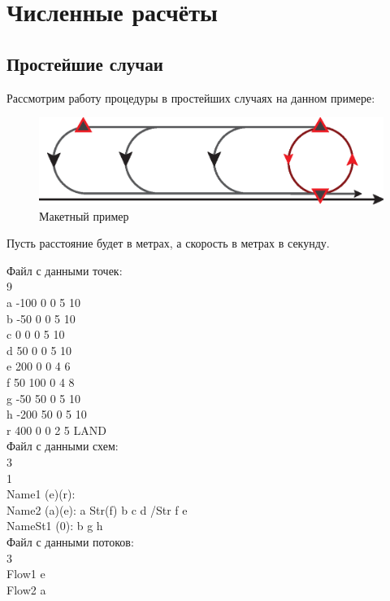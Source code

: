 \documentclass[12pt, a4 paper]{article}
\begin{document}


\section{Численные расчёты}
\subsection{Простейшие случаи}

Рассмотрим работу процедуры в простейших случаях на данном примере:

\begin{figure}[h]
  \begin{center}
      \includegraphics[scale=0.8]{StandardScheme.eps}%
        \caption{Макетный пример}                                                                             
  \end{center}
\end{figure}

Пусть расстояние будет в метрах, а скорость в метрах в секунду.

\noindent Файл с данными точек:\\
9\\
a -100 0 0 5 10\\
b -50 0 0 5 10\\
c 0 0 0 5 10\\
d 50 0 0 5 10\\
e 200 0 0 4 6\\
f 50 100 0 4 8\\
g -50 50 0 5 10\\
h -200 50 0 5 10\\
r 400 0 0 2 5 LAND\\

\noindent Файл с данными схем:\\
3\\
1\\
Name1 (e)(r):\\
Name2 (a)(e): a Str(f) b c d /Str f e\\
NameSt1 (0): b g h\\

\noindent Файл с данными потоков:\\
3\\
Flow1 e\\
Flow2 a\\
\end{document}
